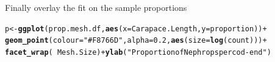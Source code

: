 \documentclass[12pt]{article}\usepackage[]{graphicx}\usepackage[]{color}
\makeatletter
\newcommand{\hlnum}[1]{\textcolor[rgb]{0.686,0.059,0.569}{#1}}%
\newcommand{\hlstr}[1]{\textcolor[rgb]{0.192,0.494,0.8}{#1}}%
\newcommand{\hlopt}[1]{\textcolor[rgb]{0,0,0}{#1}}%
\newcommand{\hlstd}[1]{\textcolor[rgb]{0.345,0.345,0.345}{#1}}%
\newcommand{\hlkwb}[1]{\textcolor[rgb]{0.69,0.353,0.396}{#1}}%
\newcommand{\hlkwc}[1]{\textcolor[rgb]{0.333,0.667,0.333}{#1}}%
\newcommand{\hlkwd}[1]{\textcolor[rgb]{0.737,0.353,0.396}{\textbf{#1}}}%
\newenvironment{kframe}{%
 \def\at@end@of@kframe{}%
 \ifinner\ifhmode%
  \def\at@end@of@kframe{\end{minipage}}%
  \begin{minipage}{\columnwidth}%
 \fi\fi%
 \def\FrameCommand##1{\hskip\@totalleftmargin \hskip-\fboxsep
 \colorbox{shadecolor}{##1}\hskip-\fboxsep
     \hskip-\linewidth \hskip-\@totalleftmargin \hskip\columnwidth}%
 \MakeFramed {\advance\hsize-\width
   \@totalleftmargin\z@ \linewidth\hsize
   \@setminipage}}%
 {\par\unskip\endMakeFramed%
 \at@end@of@kframe}
\newenvironment{knitrout}{}{} %
\makeatother
\begin{document}
Finally overlay the fit on the sample proportions

\begin{knitrout}\footnotesize
{}\color{fgcolor}\begin{kframe}
\begin{alltt}
\hlstd{p} \hlkwb{<-} \hlkwd{ggplot}\hlstd{(prop.mesh.df,} \hlkwd{aes}\hlstd{(}\hlkwc{x} \hlstd{= Carapace.Length,} \hlkwc{y} \hlstd{= proportion))} \hlopt{+}
  \hlkwd{geom_point}\hlstd{(}\hlkwc{colour} \hlstd{=} \hlstr{"#F8766D"}\hlstd{,} \hlkwc{alpha} \hlstd{=} \hlnum{0.2}\hlstd{,} \hlkwd{aes}\hlstd{(}\hlkwc{size} \hlstd{=} \hlkwd{log}\hlstd{(count)))} \hlopt{+}
\hlkwd{facet_wrap}\hlstd{(}\hlopt{~} \hlstd{Mesh.Size)} \hlopt{+} \hlkwd{ylab}\hlstd{(}\hlstr{"Proportion of Nephrops per cod-end"}\hlstd{)}


\end{alltt}
\end{kframe}
\end{knitrout}
\end{document}
